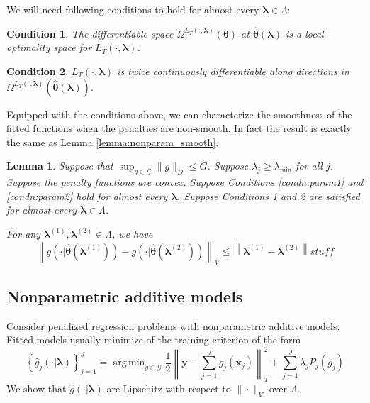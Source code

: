 \documentclass[12pt]{article}
\newtheorem{lemma}{Lemma}
\newtheorem{condition}{Condition}
\DeclareMathOperator*{\argmin}{arg\,min}
\begin{document}
We will need following conditions to hold for almost every $\boldsymbol{\lambda} \in \Lambda$:
\begin{condition}
	\label{condn:nonsmooth1}
	The differentiable space $\Omega^{L_T(\cdot, \boldsymbol{\lambda})}(\boldsymbol{\theta})$ at $\hat{\boldsymbol \theta}\left(\boldsymbol{\lambda}\right)$ is a local optimality space for $L_T\left(\cdot,\boldsymbol{\lambda}\right)$.
\end{condition}
\begin{condition}
	\label{condn:nonsmooth2}
	$L_T(\cdot, \boldsymbol{\lambda})$ is twice continuously differentiable along directions in $\Omega^{L_T(\cdot, \boldsymbol{\lambda})}(\hat{\boldsymbol \theta}\left(\boldsymbol{\lambda}\right))$.
\end{condition}

Equipped with the conditions above, we can characterize the smoothness of the fitted functions when the penalties are non-smooth. In fact the result is exactly the same as Lemma \ref{lemma:nonparam_smooth}.

\begin{lemma}
	\label{lemma:nonsmooth}
	Suppose that $\sup_{g\in\mathcal{G}}\|g\|_{D}\le G$.
	Suppose $\lambda_j \ge \lambda_{\min}$ for all $j$.
	Suppose the penalty functions are convex.
	Suppose Conditions \ref{condn:param1} and \ref{condn:param2} hold for almost every $\boldsymbol{\lambda}$.
	Suppose Conditions \ref{condn:nonsmooth1} and \ref{condn:nonsmooth2} are satisfied for almost every $\boldsymbol{\lambda} \in \Lambda$.
	
	For any $\boldsymbol \lambda^{(1)}, \boldsymbol \lambda^{(2)} \in \Lambda$, we have
	\[
	\left \| g \left(\cdot| \hat{\boldsymbol{\theta}}(\boldsymbol \lambda^{(1)}) \right )
	-g \left (\cdot| \hat{\boldsymbol{\theta}}(\boldsymbol \lambda^{(2)}) \right ) \right \|_V
	\le
	\left \|\boldsymbol \lambda^{(1)}- \boldsymbol \lambda^{(2)} \right \|
	stuff
	\]
\end{lemma}


\subsection{Nonparametric additive models}
\label{sec:smoothness_validation}

Consider penalized regression problems with nonparametric additive models. Fitted models usually minimize of the training criterion of the form
\begin{equation}
\label{orig_train_criterion}
\left\{ \hat{g}_j(\cdot | \boldsymbol \lambda) \right \}_{j=1}^J = 
\argmin_{g\in \mathcal{G}} \frac{1}{2} \left \| \boldsymbol y -  \sum_{j=1}^J g_j(\boldsymbol x_j) \right \|^2_T +
\sum_{j=1}^J \lambda_j P_j(g_j)
\end{equation}
We show that $\hat{g}(\cdot | \boldsymbol \lambda)$ are Lipschitz with respect to $\| \cdot \|_V$ over $\Lambda$.
\end{document}

